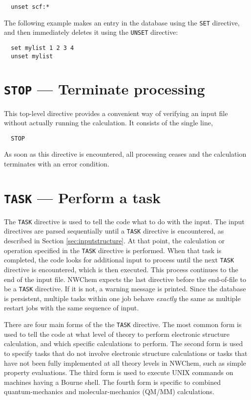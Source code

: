 \begin{verbatim}
  unset scf:*
\end{verbatim}

The following example makes an entry in the database using the
\verb+SET+ directive, and then immediately deletes it using the
\verb+UNSET+ directive:

\begin{verbatim}
  set mylist 1 2 3 4
  unset mylist
\end{verbatim}


\section{{\tt STOP} --- Terminate processing}

This top-level directive provides a convenient way of verifying 
an input file without actually running the calculation.  It consists 
of the single line,

\begin{verbatim}
  STOP
\end{verbatim}

As soon as this directive is encountered, all processing ceases and
the calculation terminates with an error condition.

\section{{\tt TASK} --- Perform a task}
\label{sec:task}

The \verb+TASK+ directive is used to tell the code what to do with the
input.  The input directives are parsed sequentially until a
\verb+TASK+ directive is encountered, as described in Section
\ref{sec:inputstructure}.  At that point, the calculation or operation
specified in the \verb+TASK+ directive is performed.  When that task
is completed, the code looks for additional input to process until the
next \verb+TASK+ directive is encountered, which is then executed.
This process continues to the end of the input file.  NWChem expects
the last directive before the end-of-file to be a \verb+TASK+
directive.  If it is not, a warning message is printed.  Since the
database is persistent, multiple tasks within one job behave {\em
  exactly} the same as multiple restart jobs with the same sequence of
input.

There are four main forms of the the \verb+TASK+ directive.  The most
common form is used to tell the code at what level of theory to
perform electronic structure calculation, and which specific
calculations to perform.  The second form is used to specify tasks
that do not involve electronic structure calculations or tasks that
have not been fully implemented at all theory levels in NWChem, such
as simple property evaluations.  The third form is used to execute
UNIX commands on machines having a Bourne shell.  The fourth form is
specific to combined quantum-mechanics and molecular-mechanics (QM/MM)
calculations.


